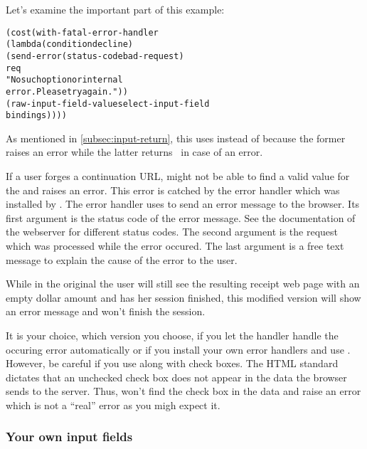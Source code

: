 Let's examine the important part of this example:

\begin{alltt}
              (cost (with-fatal-error-handler
                     (lambda (condition decline)
                       (send-error (status-code bad-request)
                                   req
                                   "No such option or internal
                                    error. Please try again."))
                     (raw-input-field-value select-input-field 
                                            bindings))))
\end{alltt}

As mentioned in \ref{subsec:input-return}, this \surflet uses
 instead of 
because the former raises an error while the latter returns \sharpf\ in
case of an error.

If a user forges a continuation URL, 
might not be able to find a valid value for the
 and raises an error.  This error is catched
by the error handler which was installed by
.  The error handler uses
 to send an error message to the browser.  Its first
argument is the status code of the error message.  See the
documentation of the \sunet webserver for different status codes.  The
second argument is the request which was processed while the error
occured.  The last argument is a free text message to explain the
cause of the error to the user.

While in the original \surflet the user will still see the resulting
receipt web page with an empty dollar amount and has her session
finished, this modified version will show an error message and won't
finish the session.

It is your choice, which version you choose, \ie if you let the
\surflet handler handle the occuring error automatically or if you
install your own error handlers and use .
However, be careful if you use  along with
check boxes.  The HTML standard dictates that an unchecked check box
does not appear in the data the browser sends to the server.  Thus,
 won't find the check box in the data and
raise an error which is not a ``real'' error as you migh expect it.


\subsubsection{Your own input fields}

